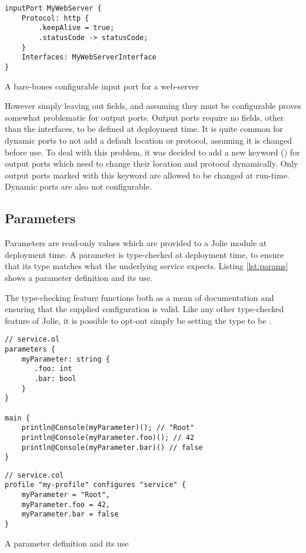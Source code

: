 \begin{listing}[H]
\begin{verbatim}
inputPort MyWebServer {
    Protocol: http {
        .keepAlive = true;
        .statusCode -> statusCode;
    }
    Interfaces: MyWebServerInterface
}
\end{verbatim}
\caption{A bare-bones configurable input port for a web-server}
\label{lst:configurable_input}
\end{listing}

However simply leaving out fields, and assuming they must be configurable
proves somewhat problematic for output ports. Output ports require no fields,
other than the interfaces, to be defined at deployment time. It is quite
common for dynamic ports to not add a default location or protocol,
assuming it is changed before use. To deal with this problem, it was
decided to add a new keyword () for output ports which
need to change their location and protocol dynamically. Only output
ports marked with this keyword are allowed to be changed at run-time.
Dynamic ports are also not configurable.

\subsection{Parameters}

Parameters are read-only values which are provided to a Jolie module at
deployment time. A parameter is type-checked at deployment time, to ensure that
its type matches what the underlying service expects. Listing \ref{lst:params}
shows a parameter definition and its use.

The type-checking feature functions both as a mean of documentation and
ensuring that the supplied configuration is valid. Like any other type-checked
feature of Jolie, it is possible to opt-out simply be setting the type to be
.

\begin{listing}[H]
\begin{multicols}{2}
\begin{verbatim}
// service.ol
parameters {
    myParameter: string {
       .foo: int
       .bar: bool
    }
}

main {
    println@Console(myParameter)(); // "Root"
    println@Console(myParameter.foo)(); // 42
    println@Console(myParameter.bar)() // false
}
\end{verbatim}

\columnbreak

\begin{verbatim}
// service.col
profile "my-profile" configures "service" {
    myParameter = "Root",
    myParameter.foo = 42,
    myParameter.bar = false
}
\end{verbatim}

\end{multicols}
\caption{A parameter definition and its use}
\label{lst:params}
\end{listing}

